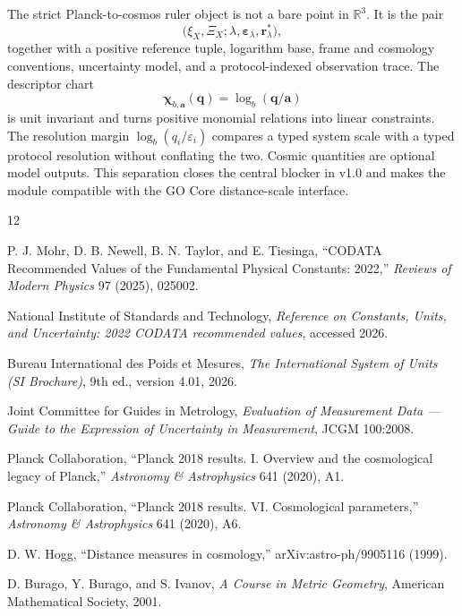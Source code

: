 \documentclass[11pt,a4paper]{article}
\theoremstyle{definition}
\theoremstyle{plain}
\theoremstyle{remark}
\newcommand{\R}{\mathbb{R}}
\begin{document}
The strict Planck-to-cosmos ruler object is not a bare point in $\R^3$.
It is the pair
\[
\bigl(
\xi_X,\Xi_X;
\lambda,\bm\varepsilon_\lambda,\bm r_\lambda^*
\bigr),
\]
together with a positive reference tuple, logarithm base, frame and
cosmology conventions, uncertainty model, and a protocol-indexed
observation trace. The descriptor chart
\[
\bm\chi_{b,\bm a}(\bm q)
=
\log_b(\bm q/\bm a)
\]
is unit invariant and turns positive monomial relations into linear
constraints. The resolution margin
$\log_b(q_i/\varepsilon_i)$ compares a typed system scale with a typed
protocol resolution without conflating the two. Cosmic quantities are
optional model outputs. This separation closes the central blocker in
v1.0 and makes the module compatible with the GO Core distance-scale
interface.

\begin{thebibliography}{12}

P. J. Mohr, D. B. Newell, B. N. Taylor, and E. Tiesinga,
``CODATA Recommended Values of the Fundamental Physical Constants:
2022,''
\emph{Reviews of Modern Physics} 97 (2025), 025002.

National Institute of Standards and Technology,
\emph{Reference on Constants, Units, and Uncertainty: 2022 CODATA
recommended values}, accessed 2026.

Bureau International des Poids et Mesures,
\emph{The International System of Units (SI Brochure)},
9th ed., version 4.01, 2026.

Joint Committee for Guides in Metrology,
\emph{Evaluation of Measurement Data --- Guide to the Expression of
Uncertainty in Measurement}, JCGM 100:2008.

Planck Collaboration,
``Planck 2018 results. I. Overview and the cosmological legacy of
Planck,''
\emph{Astronomy \& Astrophysics} 641 (2020), A1.

Planck Collaboration,
``Planck 2018 results. VI. Cosmological parameters,''
\emph{Astronomy \& Astrophysics} 641 (2020), A6.

D. W. Hogg,
``Distance measures in cosmology,''
arXiv:astro-ph/9905116 (1999).

D. Burago, Y. Burago, and S. Ivanov,
\emph{A Course in Metric Geometry},
American Mathematical Society, 2001.

\end{thebibliography}
\end{document}
